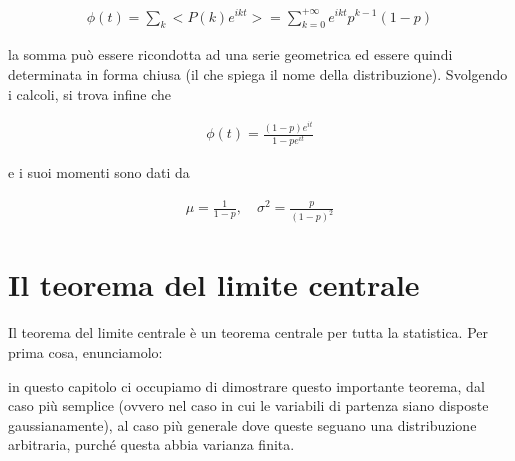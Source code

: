 \documentclass{report}
\begin{document}
\begin{align}
    \phi(t) = \sum_k <P(k)e^{ikt}> = \sum_{k=0}^{+\infty} e^{ikt}p^{k-1}(1-p)
\end{align}

la somma può essere ricondotta ad una serie geometrica ed essere quindi determinata in forma chiusa (il che spiega il nome della distribuzione). Svolgendo i calcoli, si trova infine che 

\begin{align}
    \phi(t) = \frac{(1-p)e^{it}}{1-pe^{it}}
\end{align}

e i suoi momenti sono dati da 

\begin{align}
    \mu = \frac{1}{1-p},  \quad \sigma^2 = \frac{p}{(1-p)^2} 
\end{align}













\chapter{Il teorema del limite centrale}

Il teorema del limite centrale è un teorema centrale per tutta la statistica. Per prima cosa, enunciamolo: 


in questo capitolo ci occupiamo di dimostrare questo importante teorema, dal caso più semplice (ovvero nel caso in cui le variabili di partenza siano disposte gaussianamente), al caso più generale dove queste seguano una distribuzione arbitraria, purché questa abbia varianza finita. \\
\end{document}

